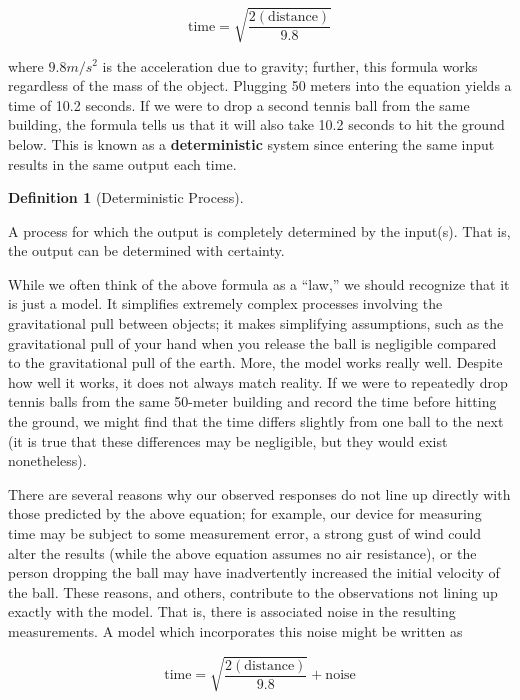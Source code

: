 \documentclass[
  letterpaper,
  DIV=11,
  numbers=noendperiod]{scrreprt}
\theoremstyle{definition}
\newtheorem{definition}{Definition}[chapter]
\theoremstyle{definition}
\theoremstyle{plain}
\theoremstyle{remark}
\begin{document}
\[\text{time} = \sqrt{\frac{2(\text{distance})}{9.8}}\]

where \(9.8 m/s^2\) is the acceleration due to gravity; further, this
formula works regardless of the mass of the object. Plugging 50 meters
into the equation yields a time of 10.2 seconds. If we were to drop a
second tennis ball from the same building, the formula tells us that it
will also take 10.2 seconds to hit the ground below. This is known as a
\textbf{deterministic} system since entering the same input results in
the same output each time.

\begin{definition}[Deterministic
Process]\protect\hypertarget{def-deterministic-process}{}\label{def-deterministic-process}

A process for which the output is completely determined by the input(s).
That is, the output can be determined with certainty.

\end{definition}

While we often think of the above formula as a ``law,'' we should
recognize that it is just a model. It simplifies extremely complex
processes involving the gravitational pull between objects; it makes
simplifying assumptions, such as the gravitational pull of your hand
when you release the ball is negligible compared to the gravitational
pull of the earth. More, the model works really well. Despite how well
it works, it does not always match reality. If we were to repeatedly
drop tennis balls from the same 50-meter building and record the time
before hitting the ground, we might find that the time differs slightly
from one ball to the next (it is true that these differences may be
negligible, but they would exist nonetheless).

There are several reasons why our observed responses do not line up
directly with those predicted by the above equation; for example, our
device for measuring time may be subject to some measurement error, a
strong gust of wind could alter the results (while the above equation
assumes no air resistance), or the person dropping the ball may have
inadvertently increased the initial velocity of the ball. These reasons,
and others, contribute to the observations not lining up exactly with
the model. That is, there is associated noise in the resulting
measurements. A model which incorporates this noise might be written as

\[\text{time} = \sqrt{\frac{2(\text{distance})}{9.8}} + \text{noise}\]
\end{document}
